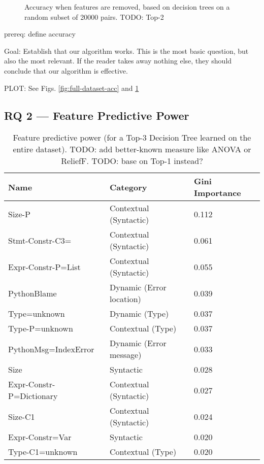 \documentclass[conference]{IEEEtran}
\begin{document}
\begin{figure}
\caption{Accuracy when features are removed, based on decision trees on a random subset of 20000 pairs.
TODO: Top-2}
\label{fig:removing-features}
\end{figure}


prereq: define accuracy

Goal: Establish that our algorithm works. This is the most basic question,
but also the most relevant. If the reader takes away nothing else, they
should conclude that our algorithm is effective.

PLOT: See Figs. \ref{fig:full-dataset-acc} and \ref{fig:removing-features}

\subsection{RQ 2 --- Feature Predictive Power}

\begin{table}[]
\begin{tabular}{lll}
Name & Category & Gini Importance \\ \bottomrule
Size-P & Contextual (Syntactic)               & 0.112 \\
Stmt-Constr-C3= & Contextual (Syntactic)      & 0.061 \\
Expr-Constr-P=List & Contextual (Syntactic)   & 0.055 \\
PythonBlame & Dynamic (Error location)        & 0.039 \\
Type=unknown & Dynamic (Type)                 & 0.037 \\
Type-P=unknown & Contextual (Type)            & 0.037 \\
PythonMsg=IndexError & Dynamic (Error message)& 0.033 \\
Size & Syntactic                              & 0.028 \\
Expr-Constr-P=Dictionary & Contextual (Syntactic) & 0.027 \\
Size-C1 & Contextual (Syntactic)              & 0.024 \\
Expr-Constr=Var & Syntactic                   & 0.020 \\
Type-C1=unknown & Contextual (Type)           & 0.020 \\
\toprule
\end{tabular}
\caption{Feature predictive power (for a Top-3 Decision Tree
learned on the entire dataset).
TODO: add
better-known measure like ANOVA or ReliefF. TODO: base on Top-1 instead?}
\label{tab-feature-predictive-power}
\end{table}
\end{document}
